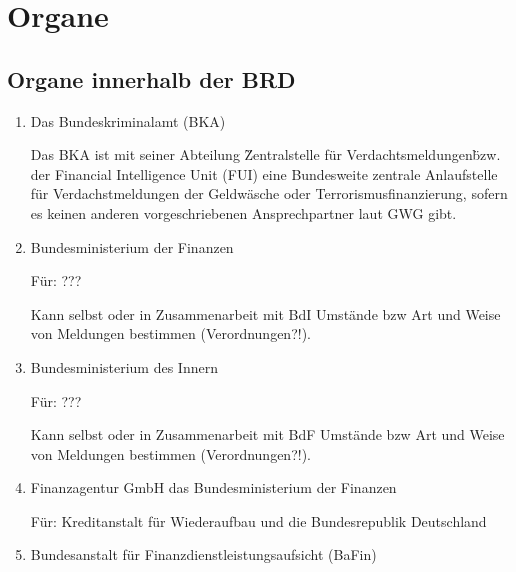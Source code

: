 \documentclass{article}
\begin{document}
    \section[Organe]{Organe}


        \subsection[Organe BRD]{Organe innerhalb der BRD}

            \begin{enumerate}

                \item Das Bundeskriminalamt (BKA)

                    Das BKA ist mit seiner Abteilung \"Zentralstelle für Verdachtsmeldungen\" bzw. der Financial Intelligence Unit (FUI) eine Bundesweite zentrale Anlaufstelle für Verdachstmeldungen der Geldwäsche oder Terrorismusfinanzierung, sofern es keinen anderen vorgeschriebenen Ansprechpartner laut GWG gibt.

                \item Bundesministerium der Finanzen

                    Für: ???

                    Kann selbst oder in Zusammenarbeit mit BdI Umstände bzw Art und Weise von Meldungen bestimmen (Verordnungen?!).

                \item Bundesministerium des Innern

                    Für: ???

                    Kann selbst oder in Zusammenarbeit mit BdF Umstände bzw Art und Weise von Meldungen bestimmen (Verordnungen?!).                

                \item Finanzagentur GmbH das Bundesministerium der Finanzen

                     Für: Kreditanstalt für Wiederaufbau und die Bundesrepublik Deutschland

                \item Bundesanstalt für Finanzdienstleistungsaufsicht (BaFin)


\end{enumerate}
\end{document}
